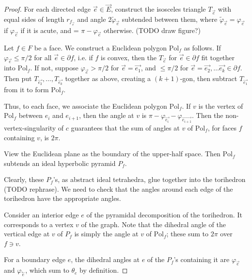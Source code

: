 \documentclass[11pt]{amsart}
\newcommand{\cev}[1]{\overset{\leftarrow}{#1}}
\newcommand{\del}{\partial}
\newcommand{\vphi}{\varphi}
\newcommand{\Pol}{{\text{Pol}}}
\theoremstyle{plain}
\theoremstyle{definition}
\begin{document}
\begin{proof}
For each directed edge $\vec{e} \in \vec{E}$,
construct the isosceles triangle $T_{\vec{e}}$
with equal sides of length $r_{f_{\vec{e}}}$ and
angle $2\tilde{\vphi}_{\vec{e}}$ subtended between them,
where $\tilde{\vphi}_{\vec{e}} = \vphi_{\vec{e}}$
if $\vphi_{\vec{e}}$ if it is acute,
and = $\pi - \vphi_{\vec{e}}$ otherwise.
(TODO draw figure?)


Let $f \in F$ be a face.
We construct a Euclidean polygon $\Pol_f$ as follows.
If $\vphi_{\vec{e}} \leq \pi/2$ for all $\vec{e} \in \del f$,
i.e. if $f$ is convex, then 
the $T_{\vec{e}}$ for $\vec{e}\in \del f$
fit together into $\Pol_f$.
If not, suppose $\vphi_{\vec{e}} > \pi/2$
for $\vec{e} = \vec{e_1}$, 
and $\leq \pi/2$ for $\vec{e} = \vec{e_2},\ldots \vec{e_k} \in \del f$.
Then put $T_{\vec{e_2}},\ldots,T_{\vec{e_k}}$ together as above,
creating a $(k+1)$-gon,
then subtract $T_{\vec{e_1}}$ from it to form $\Pol_f$.

Thus, to each face, we associate the Euclidean polygon $\Pol_f$.
If $v$ is the vertex of $\Pol_f$ between $e_i$ and $e_{i+1}$,
then the angle at $v$ is
$\pi - \vphi_{\vec{e_i}} - \vphi_{\vec{e_{i+1}}}$.
Then the non-vertex-singularity of $c$ guarantees that
the sum of angles at $v$ of $\Pol_f$, for faces $f$ containing $v$,
is $2\pi$.


View the Euclidean plane as the boundary of the upper-half space.
Then $\Pol_f$ subtends an ideal hyperbolic pyramid $P_f$.

Clearly, these $P_f$'s, as abstract ideal tetrahedra,
glue together into the torihedron (TODO rephrase).
We need to check that the angles around each edge of
the torihedron have the appropriate angles.


Consider an interior edge $e$ of the pyramidal decomposition
of the torihedron.
It corresponds to a vertex $v$ of the graph.
Note that the dihedral angle of the vertical edge
at $v$ of $P_f$ is simply the angle at $v$ of $\Pol_f$;
these sum to $2\pi$ over $f \ni v$.


For a boundary edge $e$, the dihedral angles at $e$ of the $P_f$'s
containing it are $\vphi_{\vec{e}}$ and $\vphi_{\cev{e}}$,
which sum to $\theta_e$ by definition.

\end{proof}
\end{document}

